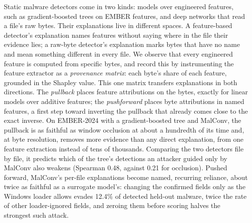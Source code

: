 Static malware detectors come in two kinds: models over engineered features, such as gradient-boosted trees on EMBER
features, and deep networks that read a file's raw bytes. Their explanations live in different spaces. A feature-based
detector's explanation names features without saying where in the file their evidence lies; a raw-byte detector's
explanation marks bytes that have no name and mean something different in every file. We observe that every engineered
feature is computed from specific bytes, and record this by instrumenting the feature extractor as a \emph{provenance
matrix}: each byte's share of each feature, grounded in the Shapley value. This one matrix transfers explanations in
both directions. The \emph{pullback} places feature attributions on the bytes, exactly for linear models over additive
features; the \emph{pushforward} places byte attributions in named features, a first step toward inverting the
pullback that already comes close to the exact inverse. On EMBER-2024 with a gradient-boosted tree and MalConv, the
pullback is as faithful as window occlusion at about a hundredth of its time and, at byte resolution, removes more
evidence than any direct explanation, from one feature extraction instead of tens of thousands. Comparing the two
detectors file by file, it predicts which of the tree's detections an attacker guided only by MalConv also weakens
(Spearman 0.48, against 0.21 for occlusion). Pushed forward, MalConv's per-file explanations become named, recurring
reliance, about twice as faithful as a surrogate model's: changing the confirmed fields only as the Windows loader
allows evades 12.4\% of detected held-out malware, twice the rate of other loader-ignored fields, and zeroing them
before scoring halves the strongest such attack.
